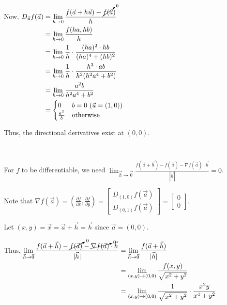 Now, 
$\begin{aligned}[t]
    D_{\vec{u}} f(\vec{a}) & = \lim_{h\to0} \frac{f(\vec{a} + h\vec{u}) - \cancelto{0}{f(\vec{a}})}{h} \\
                           & = \lim_{h\to0} \frac{f(ha, hb)}{h}                                        \\
                           & = \lim_{h\to0} \frac{1}{h} \cdot \frac{(ha)^2 \cdot hb}{(ha)^4 + (hb)^2}  \\
                           & = \lim_{h\to0} \frac{1}{h} \cdot \frac{h^3 \cdot ab}{h^2(h^2a^4 + b^2)}   \\
                           & = \lim_{h\to0} \frac{a^2b}{h^2a^4 + b^2}                                  \\
                           & = \begin{cases}
                                   0             & b = 0 ~ (\vec{u} = (1,0)) \\
                                   \frac{a^2}{b} & \text{otherwise}
                               \end{cases}
\end{aligned}$

Thus, the directional derivatives exist at $(0,0)$. 

{~~~}

For $f$ to be differentiable, we need $\lim_{\vec{h}\to\vec{0}} \frac{f(\vec{a} + \vec{h}) - f(\vec{a}) - \nabla f(\vec{a}) \cdot \vec{h}}{| \vec{h} |} = 0$. 

Note that $\nabla f(\vec{a}) = \left( \frac{\partial f}{\partial x}, \frac{\partial f}{\partial y} \right) = \begin{bmatrix} D_{(1,0)} f(\vec{a}) \\ D_{(0,1)} f(\vec{a}) \end{bmatrix} = \begin{bmatrix} 0 \\ 0 \end{bmatrix}$.

Let $(x,y) = \vec{x} = \vec{a} + \vec{h} = \vec{h}$ since $\vec{a} = (0,0)$. 

Thus, 
$\begin{aligned}[t]
    \lim_{\vec{h}\to\vec{0}} \frac{f(\vec{a} + \vec{h}) - \cancelto{0}{f(\vec{a})} - \cancelto{0}{\nabla f(\vec{a})} \cdot \vec{h}}{| \vec{h} |}
     & = \lim_{\vec{h}\to\vec{0}} \frac{f(\vec{a} + \vec{h})}{| \vec{h} |}          \\
     & = \lim_{(x,y)\to(0,0)} \frac{f(x,y)}{\sqrt{x^2 + y^2}}                       \\
     & = \lim_{(x,y)\to(0,0)} \frac{1}{\sqrt{x^2+y^2}} \cdot \frac{x^2y}{x^4 + y^2} 
\end{aligned}$

